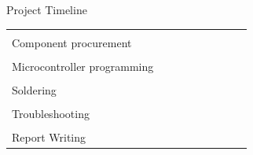 \documentclass[aspectratio=169]{beamer}
\begin{document}
\begin{frame}{Project Timeline}
\begin{table}[]
\begin{adjustbox}{totalheight=\baselineskip,center}
\begin{tabular}{|l|l|l|l|l|l|l|l|l|}
  \cellcolor[HTML]{6D9EEB} &
   &
   &
   &
   &
   \\ \hline
 &
   &
  \cellcolor[HTML]{93C47D} &
   &
  \cellcolor[HTML]{93C47D} &
   &
   &
   &
   \\ \cline{2-9} 
\multirow{-2}{*}{Component procurement} &
   &
  \cellcolor[HTML]{6D9EEB} &
   &
   &
   &
   &
   &
   \\ \hline
 &
   &
   &
  \cellcolor[HTML]{93C47D} &
  \cellcolor[HTML]{93C47D} &
  \cellcolor[HTML]{93C47D} &
   &
   &
   \\ \cline{2-9} 
\multirow{-2}{*}{Microcontroller programming} &
   &
   &
  \cellcolor[HTML]{6D9EEB} &
   &
   &
   &
   &
   \\ \hline
 &
   &
   &
   &
  \cellcolor[HTML]{93C47D} &
  \cellcolor[HTML]{93C47D} &
   &
   &
   \\ \cline{2-9} 
\multirow{-2}{*}{Soldering} &
   &
   &
   &
   &
   &
   &
   &
   \\ \hline
 &
   &
   &
   &
  \cellcolor[HTML]{93C47D} &
  \cellcolor[HTML]{93C47D} &
  \cellcolor[HTML]{93C47D} &
   &
   \\ \cline{2-9} 
\multirow{-2}{*}{Troubleshooting} &
   &
   &
   &
   &
   &
   &
   &
   \\ \hline
 &
   &
   &
   &
  \cellcolor[HTML]{93C47D} &
  \cellcolor[HTML]{93C47D} &
  \cellcolor[HTML]{93C47D} &
  \cellcolor[HTML]{93C47D} &
  \cellcolor[HTML]{93C47D} \\ \cline{2-9} 
\multirow{-2}{*}{Report Writing} &
   &
   &
   &
   &
   &
   &
   &
   \\ \hline
\end{tabular}
				\end{adjustbox}
			\end{table}
		\end{frame}
		
		
		
\end{document}
